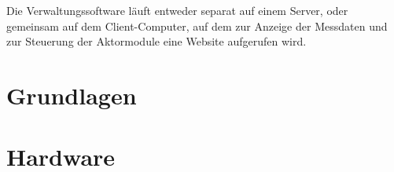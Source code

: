 \documentclass[a4paper,14pt,headsepline]{scrartcl}
\begin{document}
\begin{figure}[h]
\begin{center}
\end{center}
\end{figure}

Die Verwaltungssoftware läuft entweder separat auf einem Server, oder gemeinsam auf dem Client-Computer, auf dem zur Anzeige der Messdaten und zur Steuerung der Aktormodule eine Website aufgerufen wird. 


\newpage

\section{Grundlagen}

\section{Hardware}
\end{document}
